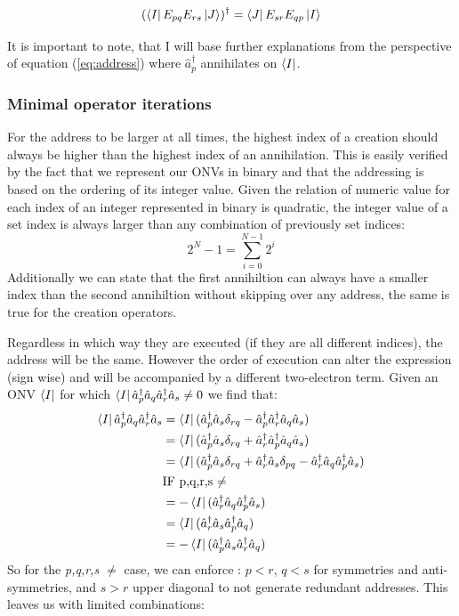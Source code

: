 \documentclass[12p]{article}
\begin{document}
\begin{equation}
  (\bra{I} E_{pq} E_{rs} \ket{J})^\dagger = \bra{J} E_{sr} E_{qp} \ket{I}
\end{equation}

It is important to note, that I will base further explanations from the perspective of equation (\ref{eq:address}) where $\hat{a}^{\dagger}_{p}$ annihilates on $\bra{I}$.

\subsubsection{Minimal operator iterations}
For the address to be larger at all times, the highest index of a creation should always be higher than the highest index of an annihilation. This is easily verified by the fact that we represent our ONVs in binary and that the addressing is based on the ordering of its integer value. Given the relation of numeric value for each index of an integer represented in binary is quadratic, the integer value of a set index is always larger than any combination of previously set indices:
\begin{equation}
  2^N - 1 = \sum^{N-1}_{i=0} 2^i
\end{equation}
Additionally we can state that the first annihiltion can always have a smaller index than the second annihiltion without skipping over any address, the same is true for the creation operators.

Regardless in which way they are executed (if they are all different indices), the address will be the same. However the order of execution can alter the expression (sign wise) and will be accompanied by a different two-electron term. Given an ONV $\bra{I}$ for which $\bra{I} \hat{a}^\dagger_p \hat{a}_q \hat{a}^\dagger_r \hat{a}_s \neq 0 $ we find that:
\begin{align}
  \bra{I} \hat{a}^\dagger_p \hat{a}_q \hat{a}^\dagger_r \hat{a}_s & = \bra{I} (\hat{a}^\dagger_p \hat{a}_s \delta_{rq} - \hat{a}^\dagger_p \hat{a}^\dagger_r \hat{a}_q \hat{a}_s) \nonumber \\
  & = \bra{I} (\hat{a}^\dagger_p  \hat{a}_s \delta_{rq} + \hat{a}^\dagger_r \hat{a}^\dagger_p \hat{a}_q \hat{a}_s) \nonumber \\
  & = \bra{I} (\hat{a}^\dagger_p  \hat{a}_s \delta_{rq} + \hat{a}^\dagger_r \hat{a}_s \delta_{pq} - \hat{a}^\dagger_r \hat{a}_q \hat{a}^\dagger_p \hat{a}_s) \label{eq:equals} \\
  & \text{IF p,q,r,s $\neq$} \nonumber \\
  & = - \bra{I}(\hat{a}^\dagger_r \hat{a}_q \hat{a}^\dagger_p \hat{a}_s )\\
  & = \bra{I} (\hat{a}^\dagger_r \hat{a}_s \hat{a}^\dagger_p \hat{a}_q ) \\
  & = - \bra{I} (\hat{a}^\dagger_p \hat{a}_s \hat{a}^\dagger_r \hat{a}_q)
\end{align}
So for the \textit{p,q,r,s $\neq$} case, we can enforce : $p<r$, $q<s$ for symmetries and anti-symmetries, and $s > r$ upper diagonal to not generate redundant addresses. This leaves us with limited combinations:
\end{document}
